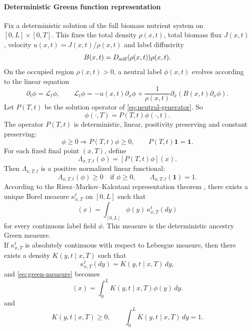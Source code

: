 \documentclass[11pt,a4paper]{report}
\begin{document}
	\paragraph{Deterministic Greens function representation}
	Fix a deterministic solution of the full biomass nutrient system on
	\([0,L]\times[0,T]\). This fixes the total density \(\rho(x,t)\), total biomass
	flux \(J(x,t)\), velocity \(u(x,t)=J(x,t)/\rho(x,t)\) and label diffusivity
	\[
	B(x,t)=D_{\rm self}(\rho(x,t))\rho(x,t).
	\]
	On the occupied region \(\rho(x,t)>0\), a neutral label
	\(\phi(x,t)\) evolves according to the linear equation
	\begin{equation}
		\partial_t\phi
		=
		\mathcal L_t\phi,
		\qquad
		\mathcal L_t\phi
		=
		-u(x,t)\partial_x\phi
		+
		\frac{1}{\rho(x,t)}
		\partial_x\!\left(B(x,t)\partial_x\phi\right).
		\label{eq:neutral-generator}
	\end{equation}
	Let \(P(T,t)\) be the solution operator of \eqref{eq:neutral-generator}. So
	\[
	\phi(\cdot,T)=P(T,t)\phi(\cdot,t).
	\]
	The operator \(P(T,t)\) is deterministic, linear, positivity preserving and
	constant preserving:
	\begin{equation}
		\phi\ge 0 \Rightarrow P(T,t)\phi\ge 0,
		\qquad
		P(T,t)\mathbf 1=\mathbf 1 .
		\label{eq:positive-markov-operator}
	\end{equation}
	For each fixed final point \((x,T)\), define
	\[
	\Lambda_{x,T,t}(\phi)=[P(T,t)\phi](x).
	\]
	Then \(\Lambda_{x,T,t}\) is a positive normalized linear functional:
	\begin{equation}
		\Lambda_{x,T,t}(\phi)\ge 0
		\quad\text{if }\phi\ge0,
		\qquad
		\Lambda_{x,T,t}(\mathbf 1)=1 .
	\end{equation}
	According to the Riesz–Markov–Kakutani representation theorem \cite{riesz}, there exists a unique Borel
	measure \(\kappa_{x,T}^{t}\) on \([0,L]\) such that
	\begin{equation}
		[P(T,t)\phi](x)
		=
		\int_{[0,L]} \phi(y)\,\kappa_{x,T}^{t}(dy)
		\label{eq:green-measure}
	\end{equation}
	for every continuous label field \(\phi\). This measure is the deterministic
	ancestry Green measure.
	\\
	If \(\kappa_{x,T}^{t}\) is absolutely continuous with respect to Lebesgue
	measure, then there exists a density \(K(y,t\mid x,T)\) such that
	\[
	\kappa_{x,T}^{t}(dy)=K(y,t\mid x,T)\,dy,
	\]
	and \eqref{eq:green-measure} becomes
	\begin{equation}
		[P(T,t)\phi](x)
		=
		\int_0^L K(y,t\mid x,T)\phi(y)\,dy .
		\label{eq:green-density}
	\end{equation}
	and
	\begin{equation}
		K(y,t\mid x,T)\ge0,
		\qquad
		\int_0^L K(y,t\mid x,T)\,dy=1 .
		\label{eq:green-density-properties}
	\end{equation}
\end{document}
